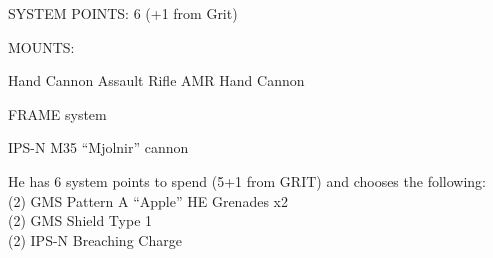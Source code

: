                                      SYSTEM POINTS: 6 (+1 from Grit)

                                                   MOUNTS:

 Hand Cannon
                       Assault Rifle                           AMR
 Hand Cannon

                                                FRAME system




                                          IPS-N M35 ``Mjolnir'' cannon

He has 6 system points to spend (5+1 from GRIT) and chooses the following:\\
(2) GMS Pattern A ``Apple'' HE Grenades x2\\
(2) GMS Shield Type 1\\
(2) IPS-N Breaching Charge
